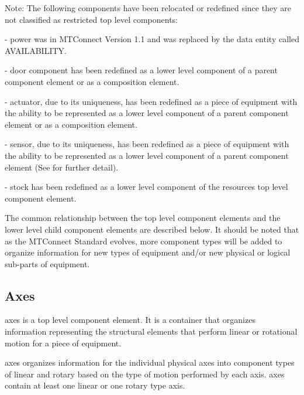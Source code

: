\documentclass{mtconnect}	%
\begin{document}
\begin{note}
\notesign \notesign Note: The following components have been relocated or redefined since they are not classified as restricted \gls{top level} components:

	\tab - \gls{power} was \DEPRECATED in MTConnect Version 1.1 and was replaced by the \gls{data entity} called AVAILABILITY.

	\tab - \gls{door component} has been redefined as a \gls{lower level} component of a parent \gls{component} element or as a \gls{composition} element.

	\tab - \gls{actuator}, due to its uniqueness, has been redefined as a piece of equipment with the ability to be represented as a \gls{lower level} component of a parent \gls{component} element or as a \gls{composition} element.

	\tab - \gls{sensor}, due to its uniqueness, has been redefined as a piece of equipment with the ability to be represented as a \gls{lower level} component of a parent \gls{component} element (See  for further detail).

	\tab - \gls{stock} has been redefined as a \gls{lower level} component of the \gls{resources} \gls{top level} \gls{component} element.

\end{note}

The common relationship between the \gls{top level} \gls{component} elements and the \gls{lower level} child \gls{component} elements are described below.  It should be noted that as the MTConnect Standard evolves, more \gls{component} types will be added to organize information for new types of equipment and/or new physical or logical sub-parts of equipment. 

\subsection{Axes}

\gls{axes} is a \gls{top level} \gls{component} element.  It is a container that organizes information representing the \glspl{structural element} that perform linear or rotational motion for a piece of equipment.

\gls{axes} organizes information for the individual physical axes into \gls{component} types of \gls{linear} and \gls{rotary} based on the type of motion performed by each axis.  \gls{axes} \must contain at least one \gls{linear} or one \gls{rotary} type axis.
\end{document}
